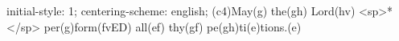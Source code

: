initial-style: 1;
centering-scheme: english;
(c4)May(g) the(gh) Lord(hv) <sp>*</sp> per(g)form(fvED) all(ef) thy(gf) pe(gh)ti(e)tions.(e)
